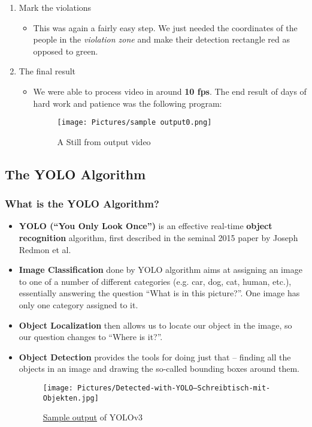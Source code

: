 \documentclass[a4paper]{article}
\begin{document}
\begin{enumerate}
    \item Mark the violations
          \begin{itemize}[label={}]
              \item This was again a fairly easy step. We just needed the coordinates of the people in the \textit{violation zone} and make their detection rectangle red as opposed to green.
		\end{itemize}
	\item The final result
		\begin{itemize}[label={}]
			\item We were able to process video in around \textbf{10 fps}. The end result of days of hard work and patience was the following program:
    			
         		\begin{figure}[h!]
            		 \centering
             		\texttt{[image: Pictures/sample output0.png]}
             		\caption{A Still from output video}
             		\label{fig:OutputVid}
      	   \end{figure}
		\end{itemize}
          
\end{enumerate}
\pagebreak
\subsection{The YOLO Algorithm}

\subsubsection{What is the YOLO Algorithm?}

\begin{itemize}
    \item \textbf{YOLO (“You Only Look Once”)}\cite{redmon2016look}\cite{redmon2018yolov3} is an effective real-time \textbf{object recognition} algorithm, first described in the seminal 2015 paper by Joseph Redmon et al.
    \item \textbf{Image Classification} done by YOLO algorithm aims at assigning an image to one of a number of different categories (e.g. car, dog, cat, human, etc.), essentially answering the question “What is in this picture?”. One image has only one category assigned to it.
    \item \textbf{Object Localization} then allows us to locate our object in the image, so our question changes to “Where is it?”.
    \item \textbf{Object Detection} provides the tools for doing just that –  finding all the objects in an image and drawing the so-called bounding boxes around them.
    \begin{figure}[h!]
        \centering
        \texttt{[image: Pictures/Detected-with-YOLO--Schreibtisch-mit-Objekten.jpg]}
        \caption{\href{https://en.wikipedia.org/wiki/Object_detection}{Sample output} of YOLOv3}
        \label{fig:YOLOv3Sample}
    \end{figure}
\end{itemize}
\end{document}
